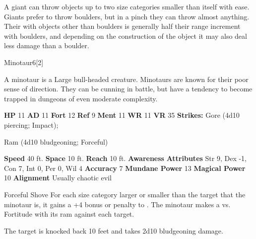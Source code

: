         A giant can throw objects up to two size categories smaller than itself with ease.
        Giants prefer to throw boulders, but in a pinch they can throw almost anything.
        Their  with objects other than boulders is generally half their range increment with boulders, and depending on the construction of the object it may also deal less damage than a boulder.
  
  
  \begin{monsection}{Minotaur}{6}[2]
    \vspace{-1em}\vspace{-1em}
    \vspace{0em}

    
        A minotaur is a Large bull-headed creature.
        Minotaurs are known for their poor sense of direction.
        They can be cunning in battle, but have a tendency to become trapped in dungeons of even moderate complexity.
      

    \begin{spellcontent}
      \begin{spelltargetinginfo}
        \pari \textbf{HP} 11 \monsep
          \textbf{AD} 11 \monsep
          \textbf{Fort} 12 \monsep
          \textbf{Ref} 9 \monsep
          \textbf{Ment} 11
        \pari \textbf{WR} 11 \monsep
        \textbf{VR} 35
        \pari \textbf{Strikes:}
            Gore  (4d10 piercing; Impact);
\par Ram  (4d10 bludgeoning; Forceful)
      \end{spelltargetinginfo}
    \end{spellcontent}
    \begin{monsterfooter}
      \pari \textbf{Speed} 40 ft. \monsep
        \textbf{Space} 10 ft. \monsep
        \textbf{Reach} 10 ft.
      \pari \textbf{Awareness} 
      \pari \textbf{Attributes}
        Str 9, Dex -1,
        Con 7, Int 0,
        Per 0, Wil 4
      \pari \textbf{Accuracy} 7 \monsep
        \textbf{Mundane Power} 13 \monsep
      \textbf{Magical Power} 10
      \pari \textbf{Alignment} Usually chaotic evil
    \end{monsterfooter}
  \end{monsection}
  \begin{freeability}{Forceful Shove}
      For each size category larger or smaller than the target that the minotaur is, it gains a +4 bonus or penalty to . The minotaur makes a 
         vs. Fortitude
        with its ram against each target.
    
    \hit The target is knocked back 10 feet and takes 2d10 bludgeoning damage.
    \end{freeability}
  
